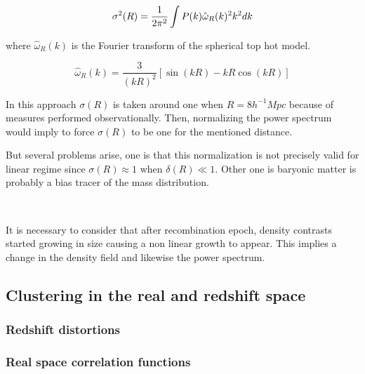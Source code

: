 \[
\sigma^2(R) = \frac{1}{2\pi^2} \int P(k)\hat{\omega}_R(k)^2k^2 dk
\]

where $\hat{\omega}_R(k)$ is the Fourier transform of the spherical top hot model.

\[\hat{\omega}_R(k) = \frac{3}{(k R)^2}[\sin(kR)-kR\cos(k R)]\]
 
In this approach $\sigma(R)$ is taken around one when $R=8h^{-1}Mpc$ because of 
measures performed observationally. 
Then, normalizing the power spectrum would imply to force $\sigma(R)$ to be one 
for the mentioned distance.

But several problems arise, one is that this normalization is not precisely valid
for linear regime since $\sigma(R)\approx 1$ when $\delta(R)\ll 1$. Other one is
baryonic matter is probably a bias tracer of the mass distribution. 

\

It is necessary to consider that after recombination epoch, density contrasts started
growing in size causing a non linear growth to appear. This implies a change in the 
density field and likewise the power spectrum. 



\subsection{ Clustering in the real and redshift space }


\subsubsection{ Redshift distortions }
\subsubsection{ Real space correlation functions }

